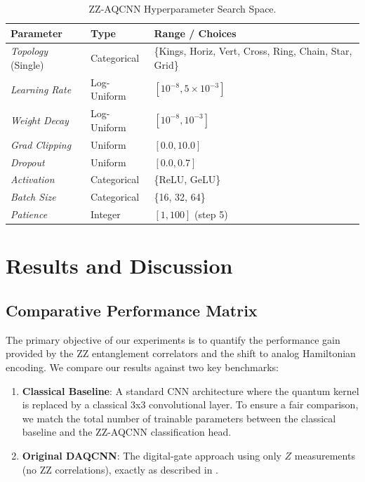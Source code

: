 \documentclass[11pt,a4paper]{article}
\begin{document}
\begin{table}[h]
    \centering
    \caption{ZZ-AQCNN Hyperparameter Search Space.}
    \begin{tabular}{lll}
        \toprule
        Parameter & Type & Range / Choices \\
        \midrule
        \textit{Topology} (Single) & Categorical & \{Kings, Horiz, Vert, Cross, Ring, Chain, Star, Grid\} \\
        \textit{Learning Rate} & Log-Uniform & $[10^{-8}, 5 \times 10^{-3}]$ \\
        \textit{Weight Decay} & Log-Uniform & $[10^{-8}, 10^{-3}]$ \\
        \textit{Grad Clipping} & Uniform & $[0.0, 10.0]$ \\
        \textit{Dropout} & Uniform & $[0.0, 0.7]$ \\
        \textit{Activation} & Categorical & \{ReLU, GeLU\} \\
        \textit{Batch Size} & Categorical & \{16, 32, 64\} \\
        \textit{Patience} & Integer & $[1, 100]$ (step 5) \\
        \bottomrule
    \end{tabular}
    \label{tab:hp_search}
\end{table}

\section{Results and Discussion}

\subsection{Comparative Performance Matrix}
The primary objective of our experiments is to quantify the performance gain provided by the ZZ entanglement correlators and the shift to analog Hamiltonian encoding. We compare our results against two key benchmarks:
\begin{enumerate}
    \item \textbf{Classical Baseline}: A standard CNN architecture where the quantum kernel is replaced by a classical 3x3 convolutional layer. To ensure a fair comparison, we match the total number of trainable parameters between the classical baseline and the ZZ-AQCNN classification head.
    \item \textbf{Original DAQCNN}: The digital-gate approach using only $Z$ measurements (no ZZ correlations), exactly as described in \cite{daqcnn2024}.
\end{enumerate}
\end{document}
